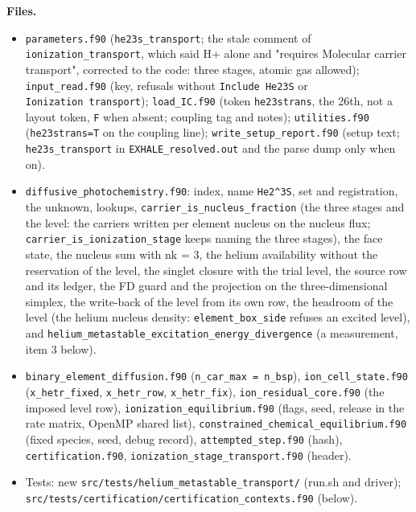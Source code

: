 \documentclass[english,a4paper]{my_memo}
\providecommand{\tightlist}{\setlength{\itemsep}{0pt}\setlength{\parskip}{0pt}}
\begin{document}
\textbf{Files.}

\begin{itemize}
\tightlist
\item
  \texttt{parameters.f90} (\texttt{he23s\_transport}; the stale comment of
  \texttt{ionization\_transport}, which said H+ alone and "requires Molecular
  carrier transport", corrected to the code: three stages, atomic gas
  allowed); \texttt{input\_read.f90} (key, refusals without \texttt{Include\ He23S} or
  \texttt{Ionization\ transport}); \texttt{load\_IC.f90} (token \texttt{he23strans}, the 26th,
  not a layout token, \texttt{F} when absent; coupling tag and notes);
  \texttt{utilities.f90} (\texttt{he23strans=T} on the coupling line);
  \texttt{write\_setup\_report.f90} (setup text; \texttt{he23s\_transport} in
  \texttt{EXHALE\_resolved.out} and the parse dump only when on).
\item
  \texttt{diffusive\_photochemistry.f90}: index, name \texttt{He2\^{}3S}, set and
  registration, the unknown, lookups, \texttt{carrier\_is\_nucleus\_fraction} (the
  three stages and the level: the carriers written per element nucleus on
  the nucleus flux; \texttt{carrier\_is\_ionization\_stage} keeps naming the three
  stages), the face state, the nucleus sum with nk = 3, the helium
  availability without the reservation of the level, the singlet closure
  with the trial level, the source row and its ledger, the FD guard and the
  projection on the three-dimensional simplex, the write-back of the level
  from its own row, the headroom of the level (the helium nucleus density:
  \texttt{element\_box\_side} refuses an excited level), and
  \texttt{helium\_metastable\_excitation\_energy\_divergence} (a measurement, item 3
  below).
\item
  \texttt{binary\_element\_diffusion.f90} (\texttt{n\_car\_max\ =\ n\_bsp}), \texttt{ion\_cell\_state.f90}
  (\texttt{x\_hetr\_fixed}, \texttt{x\_hetr\_row}, \texttt{x\_hetr\_fix}), \texttt{ion\_residual\_core.f90}
  (the imposed level row), \texttt{ionization\_equilibrium.f90} (flags, seed,
  release in the rate matrix, OpenMP shared list),
  \texttt{constrained\_chemical\_equilibrium.f90} (fixed species, seed, debug
  record), \texttt{attempted\_step.f90} (hash), \texttt{certification.f90},
  \texttt{ionization\_stage\_transport.f90} (header).
\item
  Tests: new \texttt{src/tests/helium\_metastable\_transport/} (run.sh and driver);
  \texttt{src/tests/certification/certification\_contexts.f90} (below).
\end{itemize}
\end{document}
